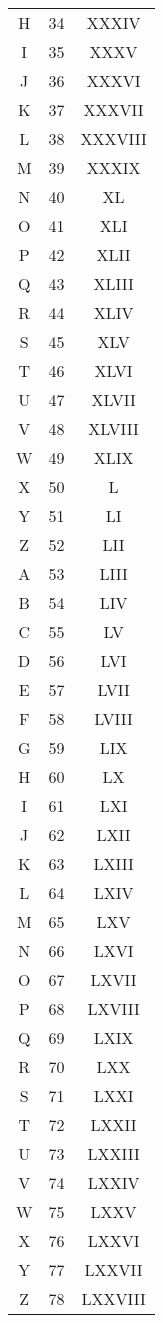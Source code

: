 \documentclass{umalayathesis}
\begin{document}
\begin{appendices}
\begin{longtable}{ccc}
    H & 34 & XXXIV \\
    I & 35 & XXXV \\
    J & 36 & XXXVI \\
    K & 37 & XXXVII \\
    L & 38 & XXXVIII \\
    M & 39 & XXXIX \\
    N & 40 & XL \\
    O & 41 & XLI \\
    P & 42 & XLII \\
    Q & 43 & XLIII \\
    R & 44 & XLIV \\
    S & 45 & XLV \\
    T & 46 & XLVI \\
    U & 47 & XLVII \\
    V & 48 & XLVIII \\
    W & 49 & XLIX \\
    X & 50 & L \\
    Y & 51 & LI \\
    Z & 52 & LII \\
    A & 53 & LIII \\
    B & 54 & LIV \\
    C & 55 & LV \\
    D & 56 & LVI \\
    E & 57 & LVII \\
    F & 58 & LVIII \\
    G & 59 & LIX \\
    H & 60 & LX \\
    I & 61 & LXI \\
    J & 62 & LXII \\
    K & 63 & LXIII \\
    L & 64 & LXIV \\
    M & 65 & LXV \\
    N & 66 & LXVI \\
    O & 67 & LXVII \\
    P & 68 & LXVIII \\
    Q & 69 & LXIX \\
    R & 70 & LXX \\
    S & 71 & LXXI \\
    T & 72 & LXXII \\
    U & 73 & LXXIII \\
    V & 74 & LXXIV \\
    W & 75 & LXXV \\
    X & 76 & LXXVI \\
    Y & 77 & LXXVII \\
    Z & 78 & LXXVIII \\
\end{longtable}


\end{appendices}
\end{document}
